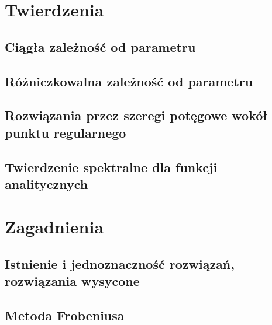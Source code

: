 



  \maketitle
  
  \tableofcontents
  
  \chapter{Twierdzenia}
    \section{Ciągła zależność od parametru}
      
    \section{Różniczkowalna zależność od parametru}
      
    \section{Rozwiązania przez szeregi potęgowe wokół punktu regularnego}
      
    \section{Twierdzenie spektralne dla funkcji analitycznych}
      
  \chapter{Zagadnienia}
    \section{Istnienie i jednoznaczność rozwiązań, rozwiązania wysycone}
      
    \section{Metoda Frobeniusa}
